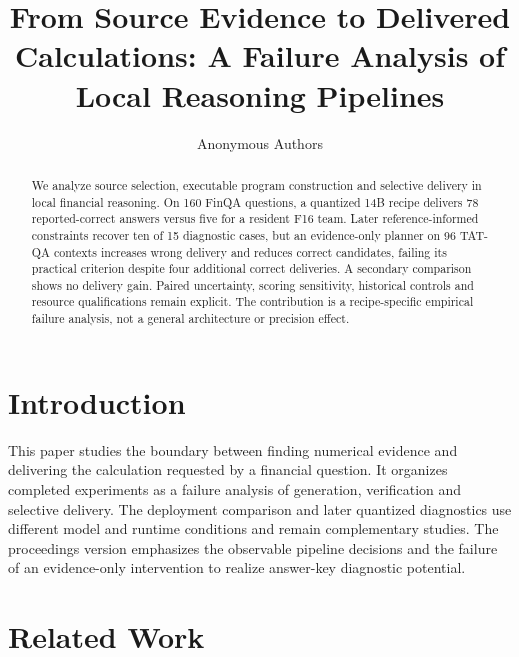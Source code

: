 \documentclass[runningheads]{llncs}
\begin{document}
\title{From Source Evidence to Delivered Calculations: A Failure Analysis of Local Reasoning Pipelines}
\author{Anonymous Authors}
\maketitle
\begin{abstract}We analyze source selection, executable program construction and selective delivery in local financial reasoning. On 160 FinQA questions, a quantized 14B recipe delivers 78 reported-correct answers versus five for a resident F16 team. Later reference-informed constraints recover ten of 15 diagnostic cases, but an evidence-only planner on 96 TAT-QA contexts increases wrong delivery and reduces correct candidates, failing its practical criterion despite four additional correct deliveries. A secondary comparison shows no delivery gain. Paired uncertainty, scoring sensitivity, historical controls and resource qualifications remain explicit. The contribution is a recipe-specific empirical failure analysis, not a general architecture or precision effect.\end{abstract}
\section{Introduction}This paper studies the boundary between finding numerical evidence and delivering the calculation requested by a financial question. It organizes completed experiments as a failure analysis of generation, verification and selective delivery. The deployment comparison and later quantized diagnostics use different model and runtime conditions and remain complementary studies. The proceedings version emphasizes the observable pipeline decisions and the failure of an evidence-only intervention to realize answer-key diagnostic potential.\section{Related Work}
\end{document}
